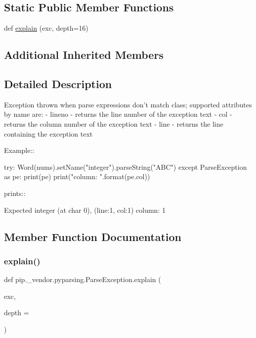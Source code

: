 \subsection*{Static Public Member Functions}
\begin{DoxyCompactItemize}
\item 
def \hyperlink{classpip_1_1__vendor_1_1pyparsing_1_1ParseException_af3464f5328c44ea1d938c60635c11a48}{explain} (exc, depth=16)
\end{DoxyCompactItemize}
\subsection*{Additional Inherited Members}


\subsection{Detailed Description}
\begin{DoxyVerb}Exception thrown when parse expressions don't match class;
supported attributes by name are:
- lineno - returns the line number of the exception text
- col - returns the column number of the exception text
- line - returns the line containing the exception text

Example::

    try:
        Word(nums).setName("integer").parseString("ABC")
    except ParseException as pe:
        print(pe)
        print("column: {}".format(pe.col))

prints::

   Expected integer (at char 0), (line:1, col:1)
    column: 1\end{DoxyVerb}
 

\subsection{Member Function Documentation}
\mbox{\label{classpip_1_1__vendor_1_1pyparsing_1_1ParseException_af3464f5328c44ea1d938c60635c11a48}} 
\subsubsection{\texorpdfstring{explain()}{explain()}}
{\footnotesize\ttfamily def pip.\+\_\+vendor.\+pyparsing.\+Parse\+Exception.\+explain (\begin{DoxyParamCaption}\item[{}]{exc,  }\item[{}]{depth = {} }\end{DoxyParamCaption})\hspace{0.3cm}{\ttfamily [static]}}

